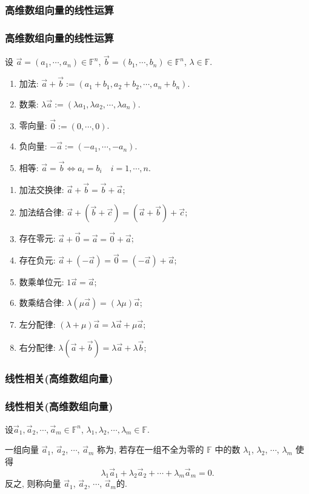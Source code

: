\subsubsection{高维数组向量的线性运算}
\begin{frame}\frametitle{高维数组向量的线性运算}
设 $\vec{a}=(a_1,\cdots,a_n)\in \mathbb F^n$, $\vec{b}=(b_1,\cdots,b_n)\in \mathbb F^n$, $\lambda\in \mathbb F$.
\begin{enumerate}[]
\item 加法: $\vec{a}+\vec{b}:=(a_1+b_1,a_2+b_2,\cdots,a_n+b_n)$.
\pp
\item 数乘: $\lambda \vec{a}:=(\lambda a_1,\lambda a_2,\cdots,\lambda a_n)$.
\pp
\item 零向量: $\vec{0}:=(0,\cdots,0)$.
\item 负向量: $-\vec{a}:=(-a_1,\cdots,-a_n)$.
\item 相等: $\vec{a}=\vec{b} \iff a_i=b_i \quad i=1,\cdots,n$.
\end{enumerate}
\pp
{}
\begin{enumerate}
\item 加法交换律: $\vec{a}+\vec{b}=\vec{b}+\vec{a}$;
\item 加法结合律: $\vec{a}+(\vec{b}+\vec{c})=(\vec{a}+\vec{b})+\vec{c}$;
\item 存在零元: $\vec{a}+\vec{0}=\vec{a}=\vec{0}+\vec{a}$;
\item 存在负元: $\vec{a}+(-\vec{a})=\vec{0}=(-\vec{a})+\vec{a}$;
\item 数乘单位元: $1\vec{a} = \vec{a}$;
\item 数乘结合律: $\lambda(\mu \vec{a})=(\lambda \mu)\vec{a}$;
\item 左分配律: $(\lambda+\mu)\vec{a}=\lambda \vec{a} + \mu \vec{a}$;
\item 右分配律: $\lambda (\vec{a}+\vec{b}) =\lambda \vec{a} + \lambda \vec{b}$;
\end{enumerate}
\end{frame}




\subsubsection{线性相关(高维数组向量)}
\begin{frame}\frametitle{线性相关(高维数组向量)}
设$\vec{a}_1,\vec{a}_2,\cdots,\vec{a}_m\in \mathbb F^n$,  $\lambda_1,\lambda_2,\cdots,\lambda_m\in \mathbb F$.
\begin{center}
\end{center}
\pp
\begin{definition}
一组向量 $\vec{a}_1$, $\vec{a}_2$, $\cdots$, $\vec{a}_m$ 称为, 若存在一组不全为零的 $\mathbb F$ 中的数  $\lambda_1$, $\lambda_2$, $\cdots$, $\lambda_m$ 使得
\[\lambda_1\vec{a}_1 + \lambda_2\vec{a}_2 + \cdots + \lambda_m\vec{a}_m=0.\]
反之,	则称向量 $\vec{a}_1$, $\vec{a}_2$, $\cdots$, $\vec{a}_m$的.
\end{definition}
\end{frame}





